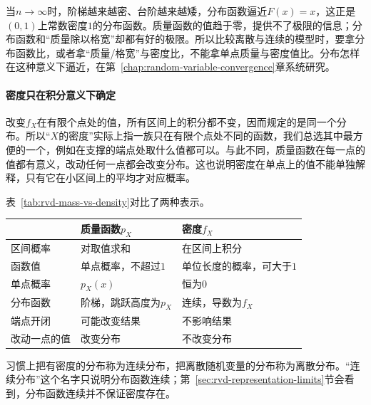 当$n\to\infty$时，阶梯越来越密、台阶越来越矮，分布函数逼近$F(x)=x$，这正是$(0,1)$上常数密度$1$的分布函数。质量函数的值趋于零，提供不了极限的信息；分布函数和“质量除以格宽”却都有好的极限。所以比较离散与连续的模型时，要拿分布函数比，或者拿“质量/格宽”与密度比，不能拿单点质量与密度值比。分布怎样在这种意义下逼近，在第~\ref{chap:random-variable-convergence}章系统研究。

\paragraph{密度只在积分意义下确定}
改变$f_X$在有限个点处的值，所有区间上的积分都不变，因而规定的是同一个分布。所以“$X$的密度”实际上指一族只在有限个点处不同的函数，我们总选其中最方便的一个，例如在支撑的端点处取什么值都可以。与此不同，质量函数在每一点的值都有意义，改动任何一点都会改变分布。这也说明密度在单点上的值不能单独解释，只有它在小区间上的平均才对应概率。

表~\ref{tab:rvd-mass-vs-density}对比了两种表示。

\begin{BookInlineTable}
  \centering
  \begin{tabular}{lll}
    \toprule
    & 质量函数$p_X$ & 密度$f_X$\\
    \midrule
    区间概率 & 对取值求和 & 在区间上积分\\
    函数值 & 单点概率，不超过$1$ & 单位长度的概率，可大于$1$\\
    单点概率 & $p_X(x)$ & 恒为$0$\\
    分布函数 & 阶梯，跳跃高度为$p_X$ & 连续，导数为$f_X$\\
    端点开闭 & 可能改变结果 & 不影响结果\\
    改动一点的值 & 改变分布 & 不改变分布\\
    \bottomrule
  \end{tabular}
  \caption{概率质量函数与概率密度函数的对比。两者都要求非负、总量为$1$；区别在于质量集中在可数个点上，还是沿实轴连续铺开。}
  \label{tab:rvd-mass-vs-density}
\end{BookInlineTable}

习惯上把有密度的分布称为连续分布，把离散随机变量的分布称为离散分布。“连续分布”这个名字只说明分布函数连续；第~\ref{sec:rvd-representation-limits}节会看到，分布函数连续并不保证密度存在。
